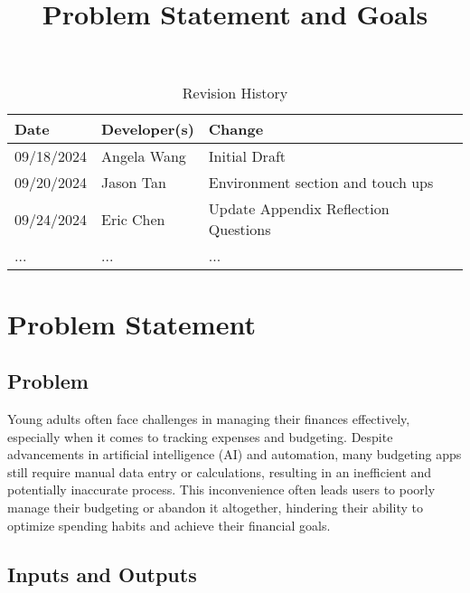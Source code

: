 \documentclass{article}
\title{Problem Statement and Goals\\\progname}
\author{\authname}
\date{}
\begin{document}
\maketitle

\begin{table}[hp]
\caption{Revision History} \label{TblRevisionHistory}
\begin{tabularx}{\textwidth}{llX}
\toprule
\textbf{Date} & \textbf{Developer(s)} & \textbf{Change}\\
\midrule
09/18/2024 & Angela Wang & Initial Draft\\
09/20/2024 & Jason Tan & Environment section and touch ups\\
09/24/2024 & Eric Chen & Update Appendix Reflection Questions\\
... & ... & ...\\
\bottomrule
\end{tabularx}
\end{table}

\section{Problem Statement}



\subsection{Problem}

Young adults often face challenges in managing their finances effectively,
especially when it comes to tracking expenses and budgeting. Despite
advancements in artificial intelligence (AI) and automation, many budgeting apps
still require manual data entry or calculations, resulting in an inefficient and
potentially inaccurate process. This inconvenience often leads users to poorly
manage their budgeting or abandon it altogether, hindering their ability to
optimize spending habits and achieve their financial goals.


\subsection{Inputs and Outputs}
\end{document}
